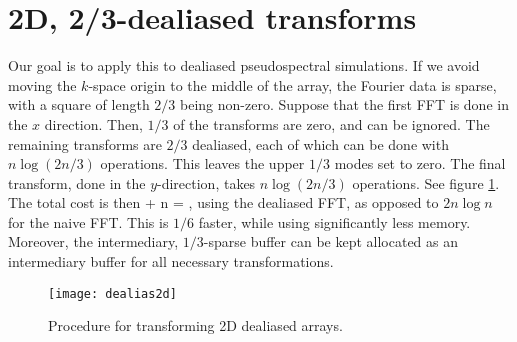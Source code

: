 \documentclass[12pt]{article}
\begin{document}
\section{2D, 2/3-dealiased transforms}
Our goal is to apply this to dealiased pseudospectral simulations. If we 
avoid moving the $k$-space origin to the middle of the array, the Fourier
data is sparse, with a square of length $2/3$ being non-zero. Suppose that 
the first FFT is done in the $x$ direction.  Then, $1/3$ of the transforms
are zero, and can be ignored. The remaining transforms are $2/3$ dealiased,
each of which can be done with $n \log (2 n/3)$ operations. This leaves
the upper $1/3$ modes set to zero.  The final transform, done in the 
$y$-direction, takes $n \log(2 n/3)$ operations.  See figure \ref{dealias2d}.
The total cost is then
\be
{} \log {} +  n \log {}
= \log {},
\ee
using the dealiased FFT, as opposed to $2 n \log n$ for the naive FFT. This 
is $1/6$ faster, while using significantly less memory. Moreover, the
intermediary, $1/3$-sparse buffer can be kept allocated as an intermediary
buffer for all necessary transformations.
\begin{figure}[htbp]
  \begin{center}
    \texttt{[image: dealias2d]}
    \caption{Procedure for transforming 2D dealiased arrays.}
    \label{dealias2d}
  \end{center}
\end{figure}
\end{document}
